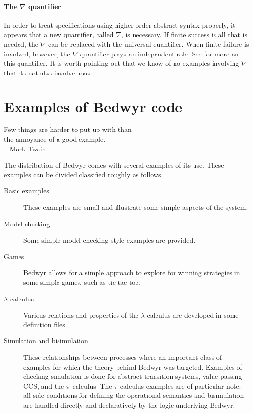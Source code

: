 \documentclass{article}
\begin{document}
\paragraph{The $\nabla$ quantifier}
In order to treat specifications using higher-order abstract syntax
properly, it appears that a new quantifier, called $\nabla$, is
necessary.  If finite success is all that is needed, the $\nabla$ can
be replaced with the universal quantifier.  When finite failure is
involved, however, the $\nabla$ quantifier plays an independent role.
See \cite{miller05tocl,tiu04phd,tiu05concur} for more on this
quantifier.  It is worth pointing out that we know of no examples
involving $\nabla$ that do not also involve hoas.

\section{Examples of Bedwyr code}

\begin{flushright}
Few things are harder to put up with than\\
the annoyance of a good example.\\
    -- Mark Twain
\end{flushright}

The distribution of Bedwyr comes with several examples of its use.
These examples can be divided classified roughly as follows.

\begin{description}
\item[Basic examples] These examples are small and illustrate some
  simple aspects of the system.

\item[Model checking] Some simple model-checking-style examples are
  provided. 

\item[Games] Bedwyr allows for a simple approach to explore for
  winning strategies in some simple games, such as tic-tac-toe.

\item[$\lambda$-calculus] Various relations and properties of the
  $\lambda$-calculus are developed in some definition files.

\item[Simulation and bisimulation] These relationships between
  processes where an important class of examples for which the theory
  behind Bedwyr was targeted.  Examples of checking simulation is done
  for abstract transition systems, value-passing CCS, and the
  $\pi$-calculus.  The $\pi$-calculus examples are of particular note:
  all side-conditions for defining the operational semantics and
  bisimulation are handled directly and declaratively by the logic
  underlying Bedwyr.  

\end{description}


\end{document}
